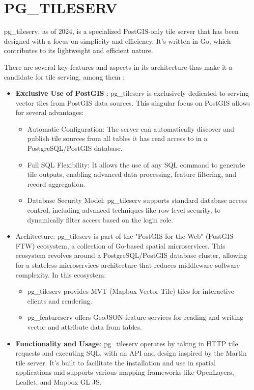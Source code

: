 \documentclass[12pt]{report}
\begin{document}
	\section{PG\_TILESERV}
	\label{sec:pgTileServ}
	
	pg\_tileserv, as of 2024, is a specialized PostGIS-only tile server that has been designed with a focus on simplicity and efficiency. It's written in Go, which contributes to its lightweight and efficient nature.
	
	There are several key features  and aspects in its architecture thas make it a candidate  for  tile serving, among them : 
	
	\begin{itemize}[noitemsep]
		\item \textbf{Exclusive Use of PostGIS} : pg\_tileserv is exclusively dedicated to serving vector tiles from PostGIS data sources. This singular focus on PostGIS allows for several advantages: 
		\begin{itemize}
			\item Automatic Configuration: The server can automatically discover and publish tile sources from all tables it has read access to in a PostgreSQL/PostGIS database.
			\item Full SQL Flexibility: It allows the use of any SQL command to generate tile outputs, enabling advanced data processing, feature filtering, and record aggregation.
			\item Database Security Model: pg\_tileserv supports standard database access control, including advanced techniques like row-level security, to dynamically filter access based on the login role.
		\end{itemize}
		
		\item Architecture: pg\_tileserv is part of the "PostGIS for the Web" (PostGIS FTW) ecosystem, a collection of Go-based spatial microservices. This ecosystem revolves around a PostgreSQL/PostGIS database cluster, allowing for a stateless microservices architecture that reduces middleware software complexity. In this ecosystem:
		\begin{itemize}
			\item pg\_tileserv provides MVT (Mapbox Vector Tile) tiles for interactive clients and rendering.
			\item pg\_featureserv offers GeoJSON feature services for reading and writing vector and attribute data from tables.
		\end{itemize}
		\item \textbf{Functionality and Usage}: pg\_tileserv operates by taking in HTTP tile requests and executing SQL, with an API and design inspired by the Martin tile server. It's built to facilitate the installation and use in spatial applications and supports various mapping frameworks like OpenLayers, Leaflet, and Mapbox GL JS.
		

\end{itemize}
\end{document}
